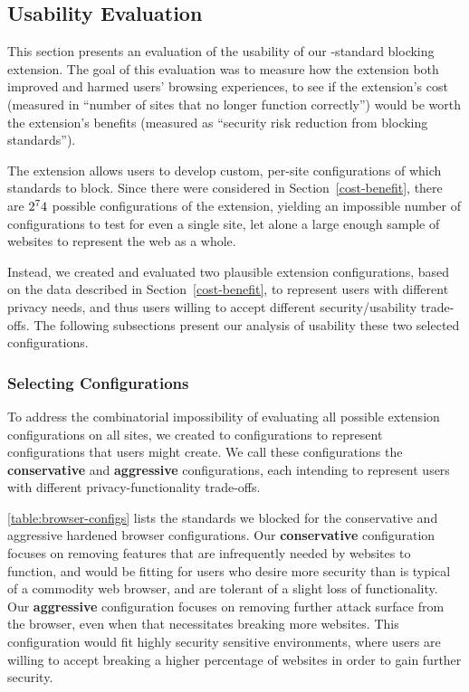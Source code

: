 \subsection{Usability Evaluation}
This section presents an evaluation of the usability of our \WAPI-standard
blocking extension.  The goal of this evaluation was to measure how the
extension both improved and harmed users' browsing experiences, to see if the
extension's cost (measured in ``number of sites that no longer function
correctly'') would be worth the extension's benefits (measured as ``security
risk reduction from blocking \WAPI standards'').

The extension allows users to develop custom, per-site configurations of
which \WAPI standards to block.  Since there were \NumStandards considered in
Section~\ref{cost-benefit}, there are \(2^74\) possible configurations
of the extension, yielding an impossible number of configurations to test
for even a single site, let alone a large enough sample of websites to
represent the web as a whole.

Instead, we created and evaluated two plausible extension configurations, based
on the data described in Section~\ref{cost-benefit}, to represent users with
different privacy needs, and thus users willing to accept different
security/usability trade-offs.  The following subsections present our analysis
of usability these two selected configurations.


\subsubsection{Selecting Configurations}
\label{current-web:extension:configurations}

To address the combinatorial impossibility of evaluating all possible
extension configurations on all sites, we created to configurations
to represent configurations that users might create.  We call these
configurations the \textbf{conservative} and \textbf{aggressive} configurations,
each intending to represent users with different privacy-functionality trade-offs.

\ref{table:browser-configs} lists the standards we blocked for the conservative
and aggressive hardened browser configurations.  Our \textbf{conservative}
configuration focuses on removing features that are infrequently needed by
websites to function, and would be fitting for users who desire more security
than is typical of a commodity web browser, and are tolerant of a slight loss
of functionality.  Our \textbf{aggressive} configuration focuses on removing
further attack surface from the browser, even when that necessitates breaking
more websites.  This configuration would fit highly security sensitive
environments, where users are willing to accept breaking a higher percentage of
websites in order to gain further security.

